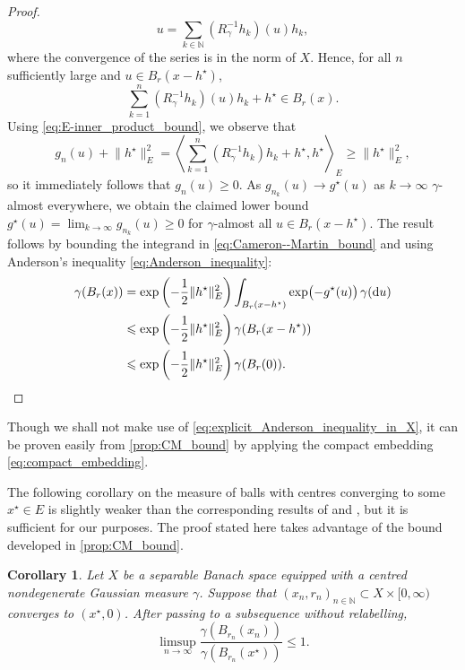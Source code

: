 \documentclass[11pt]{article}
\newcommand*{\cball}[2]{B_{#2}(#1)}
\newcommand*{\Naturals}{\mathbb{N}}
\newcommand*{\rd}{\mathrm{d}}
\renewcommand*{\geq}{\geqslant}
\renewcommand*{\leq}{\leqslant}
\newcommand*{\crcdfm}[3]{#1(\cball{#2}{#3})}
\theoremstyle{plain}
\newtheorem{corollary}[theorem]{Corollary}
\theoremstyle{definition}
\newcommand{\norm}[1]{\lVert #1 \rVert}
\numberwithin{equation}{section}
\numberwithin{figure}{section}
\numberwithin{table}{section}
\begin{document}
\begin{proof}
	\begin{equation*}
		u = \sum_{k \in \Naturals} (R_\gamma^{-1} h_k)(u) h_k,
	\end{equation*}
	where the convergence of the series is in the norm of $X$.
	Hence, for all $n$ sufficiently large and $u \in \cball{x - h^{\star}}{r}$,
	\begin{equation*}
		\sum_{k = 1}^n (R_\gamma^{-1} h_k)(u) h_k + h^{\star} \in \cball{x}{r}.
	\end{equation*}
	Using \eqref{eq:E-inner_product_bound}, we observe that
	\begin{equation*}
		g_{n}(u) + \norm{h^{\star}}_{E}^2 = \left\langle \sum_{k = 1}^n (R_{\gamma}^{-1} h_{k})h_{k} + h^{\star}, h^{\star} \right\rangle_{E} \geq \norm{h^{\star}}_{E}^{2},
	\end{equation*}
	so it immediately follows that $g_{n}(u) \geq 0$.
	As $g_{n_k}(u) \to g^{\star}(u)$ as $k \to \infty$ $\gamma$-almost everywhere, we obtain the claimed lower bound $g^{\star}(u) = \lim_{k \to \infty} g_{n_k}(u) \geq 0$ for $\gamma$-almost all $u \in \cball{x - h^{\star}}{r}$.
	The result follows by bounding the integrand in \eqref{eq:Cameron--Martin_bound} and using Anderson's inequality \eqref{eq:Anderson_inequality}:
	\begin{align*}
		\crcdfm{\gamma}{x}{r} &= \exp\left(-\frac{1}{2} \norm{h^{\star}}_{E}^{2}\right) \int_{\cball{x - h^{\star}}{r}} \exp\bigl(-g^{\star}(u)\bigr) \,\gamma(\rd u) \\
		&\leq \exp\left(-\frac{1}{2} \norm{h^{\star}}_{E}^{2}\right) \crcdfm{\gamma}{x - h^{\star}}{r} \\
		&\leq \exp\left(-\frac{1}{2} \norm{h^{\star}}_{E}^{2}\right) \crcdfm{\gamma}{0}{r}. \qedhere
	\end{align*}
\end{proof}

Though we shall not make use of \eqref{eq:explicit_Anderson_inequality_in_X}, it can be proven easily from \cref{prop:CM_bound} by applying the compact embedding \eqref{eq:compact_embedding}.

The following corollary on the measure of balls with centres converging to some $x^{\star} \in E$ is slightly weaker than the corresponding results of \citet[Lemma~4.14]{Kretschmann2019} and \citet[Lemma~A.2]{KlebanovWacker2022}, but it is sufficient for our purposes.
The proof stated here takes advantage of the bound developed in \cref{prop:CM_bound}.

\begin{corollary}
	\label{cor:Gaussian_measure_limits}
	Let $X$ be a separable Banach space equipped with a centred nondegenerate Gaussian measure $\gamma$.
	Suppose that $(x_{n}, r_{n})_{n \in \Naturals} \subset X \times [0, \infty)$ converges to $(x^{\star}, 0)$.
	After passing to a subsequence without relabelling,
	\begin{equation*}
		\limsup_{n \to \infty} \frac{\crcdfm{\gamma}{x_{n}}{r_{n}}}{\crcdfm{\gamma}{x^{\star}}{r_{n}}} \leq 1.
	\end{equation*}
\end{corollary}
\end{document}
